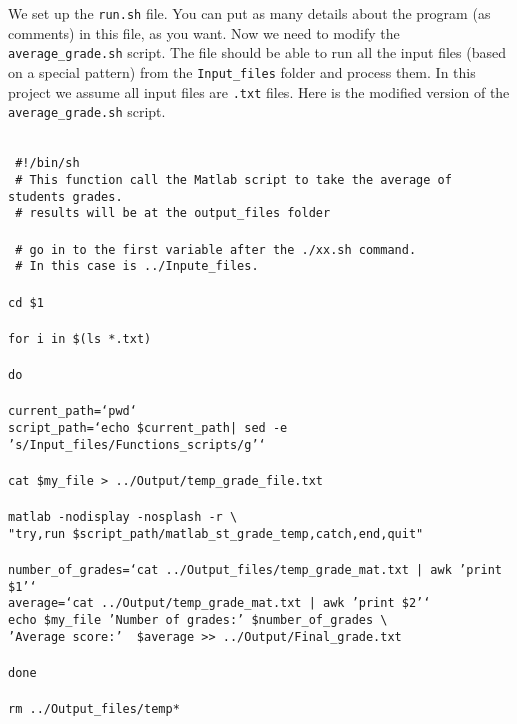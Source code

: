 \noindent
We set up the \texttt{run.sh} file. You can put as many details about the program (as comments) in this file, as you want. Now we need to modify the \texttt{average\_grade.sh} script. The file should be able to run all the input files (based on a special pattern) from the \texttt{Input\_files} folder and process them. In this project we assume all input files are \texttt{.txt} files. Here is the modified version of the \texttt{average\_grade.sh} script.





 
\begin{mdframed}[hidealllines=true,backgroundcolor=gray!20]
\begin{singlespace}
\fontsize{10pt}{1pt}
\texttt{
\\
{ \color{matlab_green} \#!/bin/sh}\\
{ \color{matlab_green} \# This function call the Matlab script to take the average of students grades.}\\
{ \color{matlab_green} \# results will be at the output\_files folder}\\
\\
{ \color{matlab_green} \# go in to the first variable after the ./xx.sh command.}\\
{ \color{matlab_green} \# In this case is ../Inpute\_files.}\\
\\
cd \$1\\
\\
{\color{for_pink}for} i {\color{for_pink}in} \$(ls *.txt)\\
\\
{\color{for_pink}do}\\
\\
current\_path={\color{red}`pwd`}\\
script\_path={\color{red}`echo \$current\_path| sed -e 's/Input\_files/Functions\_scripts/g'`}\\
\\
cat \$my\_file > ../Output/temp\_grade\_file.txt\\
\\
matlab -nodisplay -nosplash -r   \textbackslash \\
{\color{red}"try,run \$script\_path/matlab\_st\_grade\_temp,catch,end,quit"}\\
\\
number\_of\_grades={\color{red}`cat ../Output\_files/temp\_grade\_mat.txt | awk '{print \$1}'`}\\
average={\color{red}`cat ../Output/temp\_grade\_mat.txt | awk '{print \$2}'`}\\
echo \$my\_file {\color{red}'Number of grades:'}  \$number\_of\_grades \textbackslash \\
\phantom{x}\hspace{14ex} {\color{red}'Average score:'} \  \$average >> ../Output/Final\_grade.txt \\
\\
{\color{for_pink}done}\\
\\
rm ../Output\_files/temp*  \\  
 }
\end{singlespace}
\end{mdframed}
